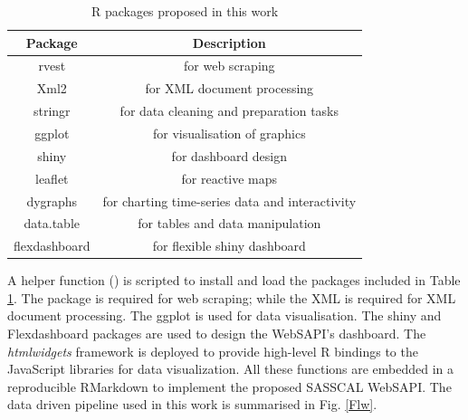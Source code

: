 \documentclass[a4paper, 10pt, conference]{ieeeconf}      %
\begin{document}
\begin{table}[h!]
 \caption{R packages proposed in this work}
\centering
\begin{tabular}{||c | c||} 
 \hline
 Package &  Description    \\ [0.5ex] 
 \hline\hline
rvest  \cite{wickham2016package} & for web scraping   \\ \hline
 Xml2 \cite{lang2015package}   & for XML document processing  \\ \hline
   stringr \cite{wickham2019package} & for data cleaning and preparation tasks   \\ \hline
  ggplot \cite{wickham2011ggplot2} & for visualisation of graphics   \\ \hline
 shiny \cite{chang2015package} & for  dashboard design   \\ \hline
  leaflet  \cite{graul2016package} & for  reactive maps   \\ \hline
dygraphs \cite{vanderkam2015dygraphs} & for  charting time-series data and interactivity   \\ \hline
  data.table \cite{dowle2019package} &  for  tables and  data manipulation   \\ \hline
       flexdashboard \cite{allaire2017flexdashboard} &  for  flexible shiny dashboard   \\  %
 \hline
\end{tabular}
\label{tabla}
\end{table}
\newpage
\noindent
 A helper function () is scripted to install and load the packages included in Table \ref{tabla}.
The  \cite{wickham2016package} package is required  for web scraping; while the XML \cite{lang2015package} is required for XML document processing. The   ggplot \cite{wickham2011ggplot2} is used for data visualisation. 
The  shiny \cite{chang2015package}   and Flexdashboard \cite{allaire2017flexdashboard} packages are used to design  the WebSAPI's  dashboard.
The \emph{htmlwidgets} framework is deployed to provide high-level R bindings to the JavaScript  libraries for data visualization.  All these functions are embedded in a reproducible RMarkdown  to implement the proposed SASSCAL WebSAPI.
The  data driven pipeline used in this work is summarised  in Fig. \ref{Flw}.
\end{document}
